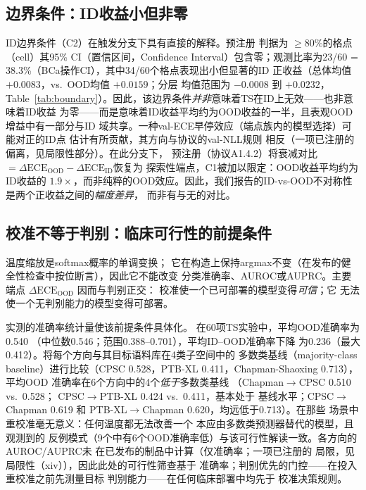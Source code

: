 \subsection{边界条件：ID收益小但非零}
ID边界条件（C2）在触发分支下具有直接的解释。预注册
判据为 $\geq$80\%的格点（cell）其95\% CI（置信区间，Confidence Interval）包含零；观测比率为23/60 =
38.3\%（BCa操作CI），其中34/60个格点表现出小但显著的ID
正收益（总体均值 $+0.0083$，vs.\ OOD均值 $+0.0159$；分层
均值范围为 $-0.0008$ 到 $+0.0232$，
Table~\ref{tab:boundary}）。因此，该边界条件\emph{并非}意味着TS在ID上无效——也非意味着ID收益
为零——而是意味着ID收益平均约为OOD收益的一半，且表观OOD增益中有一部分与ID
域共享。一种val-ECE早停效应（端点族内的模型选择）可能对正的ID点
估计有所贡献，其方向与协议的val-NLL规则
相反（一项已注册的偏离，见局限性部分）。在此分支下，
预注册（协议A1.4.2）将衰减对比
$=\Delta\text{ECE}_{\text{OOD}}-\Delta\text{ECE}_{\text{ID}}$恢复为
探索性端点，C1被加以限定：OOD收益平均约为ID收益的
$1.9\times$，而非纯粹的OOD效应。因此，我们报告的ID-vs-OOD不对称性是两个正收益之间的\emph{幅度差异}，
而非有与无的对比。

\subsection{校准不等于判别：临床可行性的前提条件}
温度缩放是softmax概率的单调变换；
它在构造上保持argmax不变（在发布的健全性检查中按位断言），因此它不能改变
分类准确率、AUROC或AUPRC。主要端点
$\Delta\text{ECE}_{\text{OOD}}$ 因而与判别正交：
校准使一个已可部署的模型变得\emph{可信}；它
无法使一个无判别能力的模型变得可部署。

实测的准确率统计量使该前提条件具体化。
在60项TS实验中，平均OOD准确率为0.540
（中位数0.546；范围0.388--0.701），平均ID--OOD准确率下降
为0.236（最大0.412）。将每个方向与其目标语料库在4类子空间中的
多数类基线（majority-class baseline）进行比较（CPSC 0.528，PTB-XL 0.411，Chapman-Shaoxing 0.713），平均OOD
准确率在6个方向中的4个\emph{低于}多数类基线
（Chapman$\rightarrow$CPSC 0.510 vs.\ 0.528；
CPSC$\rightarrow$PTB-XL 0.424 vs.\ 0.411，基本处于
基线水平；CPSC$\rightarrow$Chapman 0.619 和
PTB-XL$\rightarrow$Chapman 0.620，均远低于0.713）。在那些
场景中重校准毫无意义：任何温度都无法改善一个
本应由多数类预测器替代的模型，且观测到的
反例模式（9个中有6个OOD准确率低）与该可行性解读一致。各方向的AUROC/AUPRC未
在已发布的制品中计算（仅准确率；一项已注册的
局限，见局限性（xiv）），因此此处的可行性筛查基于
准确率；判别优先的门控——在投入重校准之前先测量目标
判别能力——在任何临床部署中均先于
校准决策规则。


